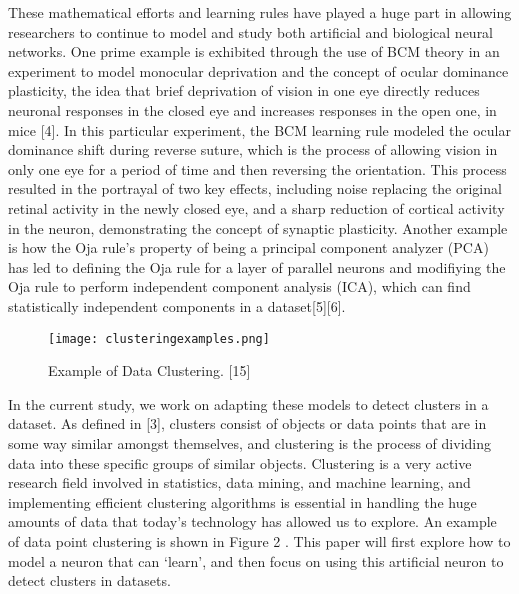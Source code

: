 \documentclass[10pt,twoside]{article}
\begin{document}
These mathematical efforts and learning rules have played a huge part in allowing researchers to continue to model and study both artificial and biological neural networks. 
One prime example is exhibited through the use of BCM theory in an experiment to model monocular deprivation and the concept 
of ocular dominance plasticity, the idea that brief deprivation of vision in one eye directly reduces neuronal responses in the closed eye and increases
responses in the open one, in mice [4]. In this particular experiment, the BCM learning rule modeled the ocular dominance shift during reverse suture, which is the process
of allowing vision in only one eye for a period of time and then reversing the orientation. This process resulted in the portrayal of two key effects, 
including noise replacing the original retinal activity in the newly closed eye, and a sharp reduction of cortical activity in the neuron, demonstrating the concept of synaptic plasticity. Another example is how the Oja rule's property of being a principal component analyzer (PCA) has led to defining the Oja rule for a layer of parallel neurons and modifiying the Oja rule to
perform independent component analysis (ICA), which can find statistically independent components in a dataset[5][6]. 

\begin{figure}[H]\small\centering\label{fig2}
\texttt{[image: clusteringexamples.png]}
\caption{Example of Data Clustering. [15]}
\end{figure}

In the current study, we work on adapting these models to detect clusters 
in a dataset. As defined in [3], clusters consist of objects or data points that 
are in some way similar amongst themselves, and clustering is the process of 
dividing data into these specific groups of similar objects. Clustering is a very active 
research field involved in statistics, data mining, and machine learning, and implementing
efficient clustering algorithms is essential in handling the huge amounts of data that 
today's technology has allowed us to explore. An example of data point clustering is shown in Figure 2 .
This paper will first explore how to model a neuron that can `learn', and then focus on using this
artificial neuron to detect clusters in datasets.

\end{document}
